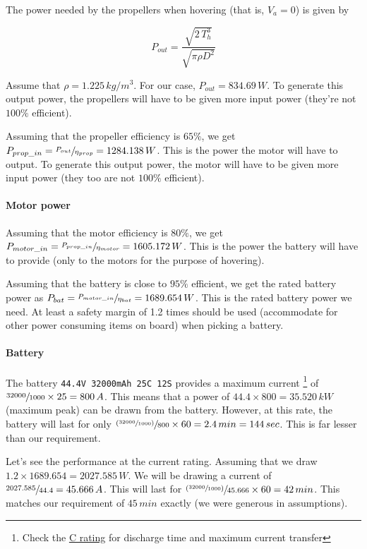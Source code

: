 The power needed by the propellers when hovering (that is, $V_a = 0$) is given by

\begin{equation}
    P_{out} = \frac{\sqrt{2\,T_h^3}}{\sqrt{\pi \rho D^2}}
\end{equation}

Assume that $\rho = 1.225\,kg/m^3$. For our case, $P_{out} = 834.69\,W$. To generate this output power, the propellers will have to be given more input power (they're not $100\%$ efficient).

Assuming that the propeller efficiency is $65\%$, we get $P_{prop\_in} = \sfrac{P_{out}}{\eta_{prop}} = 1284.138\,W$. This is the power the motor will have to output. To generate this output power, the motor will have to be given more input power (they too are not $100\%$ efficient).

\paragraph*{Motor power}

Assuming that the motor efficiency is $80\%$, we get $P_{motor\_in} = \sfrac{P_{prop\_in}}{\eta_{motor}} = 1605.172\,W$. This is the power the battery will have to provide (only to the motors for the purpose of hovering).

Assuming that the battery is close to $95\%$ efficient, we get the rated battery power as $P_{bat} = \sfrac{P_{motor\_in}}{\eta_{bat}} = 1689.654\,W$. This is the rated battery power we need. At least a safety margin of 1.2 times should be used (accommodate for other power consuming items on board) when picking a battery.

\paragraph*{Battery}

The battery \texttt{44.4V 32000mAh 25C 12S} provides a maximum current
\footnote{Check the \href{https://www.power-sonic.com/blog/what-is-a-battery-c-rating/}{C rating} for discharge time and maximum current transfer}
of $\sfrac{32000}{1000} \times 25 = 800\,A$. This means that a power of $44.4 \times 800 = 35.520\,kW$ (maximum peak) can be drawn from the battery. However, at this rate, the battery will last for only $\sfrac{(\sfrac{32000}{1000})}{800}\times60 = 2.4\,min = 144\,sec$. This is far lesser than our requirement. 

Let's see the performance at the current rating. Assuming that we draw $1.2\times1689.654 = 2027.585\,W$. We will be drawing a current of $\sfrac{2027.585}{44.4} = 45.666\,A$. This will last for $\sfrac{(\sfrac{32000}{1000})}{45.666}\times60 = 42\,min$. This matches our requirement of $45\,min$ exactly (we were generous in assumptions).
